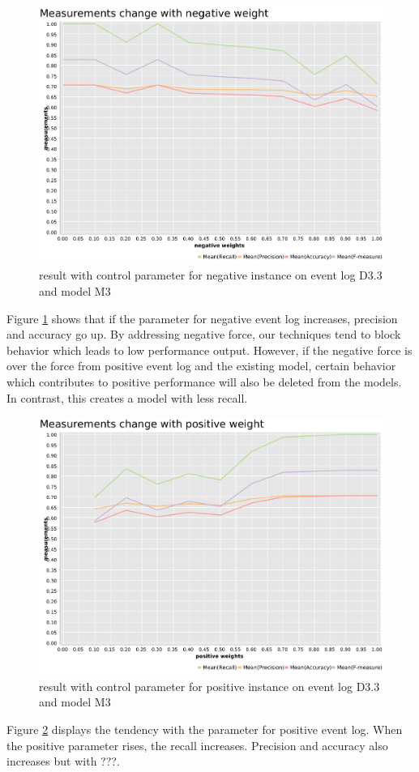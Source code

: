\begin{figure}[h]
	\includegraphics[width=\linewidth]{figures/evaluation/M3-D43-neg-weight-plot.pdf}
	\caption{result with control parameter for negative instance on event log D3.3 and model M3}
	\label{fig:neg-weight}
\end{figure}
Figure \ref{fig:neg-weight} shows that if the parameter for negative event log increases, precision and accuracy go up. By addressing negative force, our techniques tend to block behavior which leads to low performance output. However, if the negative force is over the force from positive event log and the existing model, certain behavior which contributes to positive performance will also be deleted from the models. In contrast, this creates a model with less recall. 


\begin{figure}[h]
	\includegraphics[width=\linewidth]{figures/evaluation/M3-D43-pos-weight-plot.pdf}
	\caption{result with control parameter for positive instance on event log D3.3 and model M3}
	\label{fig:pos-weight}
\end{figure}
Figure \ref{fig:pos-weight} displays the tendency with the parameter for positive event log. When the positive parameter rises, the recall increases. Precision and accuracy also increases but with ???.